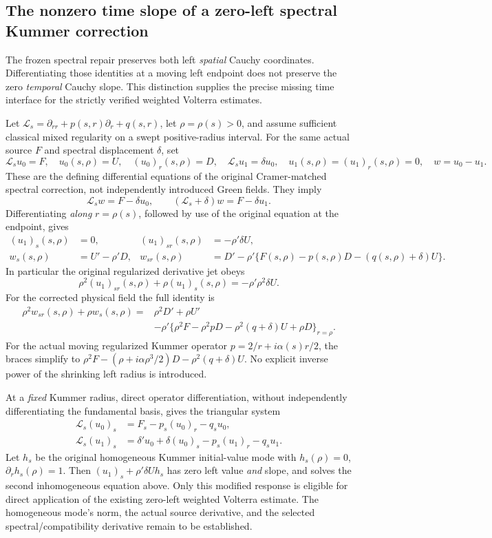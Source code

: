\subsection*{The nonzero time slope of a zero-left spectral Kummer correction}

\noindent
The frozen spectral repair preserves both left \emph{spatial} Cauchy
coordinates. Differentiating those identities at a moving left
endpoint does not preserve the zero \emph{temporal} Cauchy slope.
This distinction supplies the precise missing time interface for the
strictly verified weighted Volterra estimates.

Let \(\mathcal L_s=\partial_{rr}+p(s,r)\partial_r+q(s,r)\),
let \(\rho=\rho(s)>0\), and assume sufficient classical mixed
regularity on a swept positive-radius interval. For the same actual
source \(F\) and spectral displacement \(\delta\), set
\[
\mathcal L_su_0=F,\quad
u_0(s,\rho)=U,\quad (u_0)_r(s,\rho)=D,
\quad
\mathcal L_su_1=\delta u_0,\quad
u_1(s,\rho)=(u_1)_r(s,\rho)=0,\quad w=u_0-u_1.
\]
These are the defining differential equations of the original
Cramer-matched spectral correction, not independently introduced
Green fields. They imply
\[
\mathcal L_sw=F-\delta u_0,\qquad
(\mathcal L_s+\delta)w=F-\delta u_1.
\]
Differentiating \emph{along} \(r=\rho(s)\), followed by use of
the original equation at the endpoint, gives
\begin{align*}
(u_1)_s(s,\rho)&=0,&
(u_1)_{sr}(s,\rho)&=-\rho'\delta U,\\
w_s(s,\rho)&=U'-\rho'D,&
w_{sr}(s,\rho)&=
 D'-\rho'\{F(s,\rho)-p(s,\rho)D-(q(s,\rho)+\delta)U\}.
\end{align*}
In particular the original regularized derivative jet obeys
\[
\rho^2(u_1)_{sr}(s,\rho)+\rho(u_1)_s(s,\rho)
=-\rho'\rho^2\delta U .
\]
For the corrected physical field the full identity is
\[
\begin{split}
\rho^2w_{sr}(s,\rho)+\rho w_s(s,\rho)
={}&\rho^2D'+\rho U'\\
&-\rho'
\{\rho^2F-\rho^2pD-\rho^2(q+\delta)U+\rho D\}_{r=\rho}.
\end{split}
\]
For the actual moving regularized Kummer operator
\(p=2/r+i\alpha(s)r/2\), the braces simplify to
\(\rho^2F-(\rho+i\alpha\rho^3/2)D-\rho^2(q+\delta)U\).
No explicit inverse power of the shrinking left radius is introduced.

At a \emph{fixed} Kummer radius, direct operator
differentiation, without independently differentiating the fundamental
basis, gives the triangular system
\[
\begin{aligned}
\mathcal L_s(u_0)_s
 &=F_s-p_s(u_0)_r-q_su_0,\\
\mathcal L_s(u_1)_s
 &=\delta'u_0+\delta(u_0)_s
 -p_s(u_1)_r-q_su_1.
\end{aligned}
\]
Let \(h_s\) be the original homogeneous Kummer initial-value mode
with \(h_s(\rho)=0\), \(\partial_rh_s(\rho)=1\).
Then \((u_1)_s+\rho'\delta U h_s\) has zero left value
\emph{and} slope, and solves the second inhomogeneous equation above.
Only this modified response is eligible for direct application of
the existing zero-left weighted Volterra estimate. The homogeneous
mode's norm, the actual source derivative, and the selected
spectral/compatibility derivative remain to be established.

